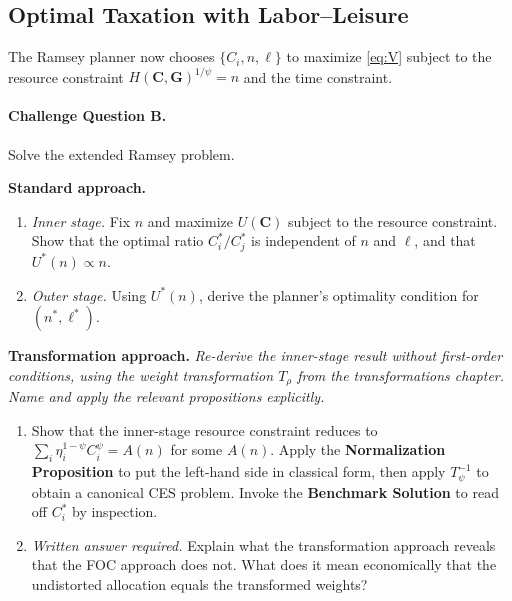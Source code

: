 \subsection{Optimal Taxation with Labor--Leisure}
\label{subsec:ramsey-extended}
 
The Ramsey planner now chooses $\{C_i, n, \ell\}$ to maximize \eqref{eq:V} subject to the resource constraint $H(\mathbf{C}, \mathbf{G})^{1/\psi} = n$ and the time constraint.
 
\paragraph{Challenge Question B.}
Solve the extended Ramsey problem.
 
\medskip
\noindent\textbf{Standard approach.}
 
\begin{enumerate}[label=(\alph*)]
    \item \emph{Inner stage.} Fix $n$ and maximize $U(\mathbf{C})$ subject to the resource constraint. Show that the optimal ratio $C_i^*/C_j^*$ is independent of $n$ and $\ell$, and that $U^*(n) \propto n$.
 
    \item \emph{Outer stage.} Using $U^*(n)$, derive the planner's optimality condition for $(n^*, \ell^*)$.
\end{enumerate}
 
\medskip
\noindent\textbf{Transformation approach.} \emph{Re-derive the inner-stage result without first-order conditions, using the weight transformation $T_\rho$ from the transformations chapter. Name and apply the relevant propositions explicitly.}
 
\begin{enumerate}[label=(\alph*), resume]
    \item Show that the inner-stage resource constraint reduces to $\sum_i \eta_i^{1-\psi} C_i^\psi = A(n)$ for some $A(n)$. Apply the \textbf{Normalization Proposition} to put the left-hand side in classical form, then apply $T_\psi^{-1}$ to obtain a canonical CES problem. Invoke the \textbf{Benchmark Solution} to read off $C_i^*$ by inspection.
 
    \item \emph{Written answer required.} Explain what the transformation approach reveals that the FOC approach does not. What does it mean economically that the undistorted allocation equals the transformed weights?
\end{enumerate}
 
